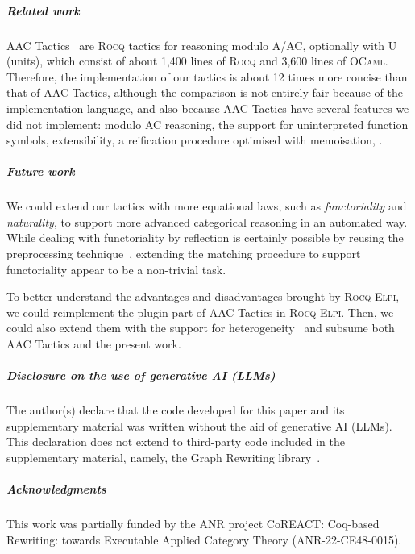 \documentclass[a4paper,UKenglish,cleveref,autoref]{lipics-v2021}
\newcommand{\Rocq}{{\sffamily\scshape Rocq}\xspace}
\newcommand{\RocqElpi}{{\sffamily\scshape Rocq-Elpi}\xspace}
\newcommand{\OCaml}{{\sffamily\scshape OCaml}\xspace}
\begin{document}
\subparagraph{Related work}
AAC Tactics~\cite{DBLP:conf/cpp/BraibantP11,aac-tactics} are \Rocq tactics for reasoning modulo
A/AC, optionally with U (units), which consist of about 1,400 lines of \Rocq and 3,600 lines of
\OCaml.
Therefore, the implementation of our tactics is about 12 times more concise than that of AAC
Tactics, although the comparison is not entirely fair because of the implementation language, and
also because AAC Tactics have several features we did not implement: modulo AC reasoning, the
support for uninterpreted function symbols, extensibility, a reification procedure optimised with
memoisation, \etc.

\subparagraph{Future work}
We could extend our tactics with more equational laws, such as \emph{functoriality} and
\emph{naturality}, to support more advanced categorical reasoning in an automated way.
While dealing with functoriality by reflection is certainly possible by reusing the preprocessing
technique~\cite{DBLP:conf/itp/Sakaguchi22}, extending the matching procedure to support
functoriality appear to be a non-trivial task.

To better understand the advantages and disadvantages brought by \RocqElpi, we could reimplement
the plugin part of AAC Tactics in \RocqElpi.
Then, we could also extend them with the support for heterogeneity~\cite[Section
  6.2]{DBLP:conf/cpp/BraibantP11} and subsume both AAC Tactics and the present work.

\ifx\authoranonymous\relax
\subparagraph{Disclosure on the use of generative AI (LLMs)}

The author(s) declare that the code developed for this paper and its supplementary material was
written without the aid of generative AI (LLMs). This declaration does not extend to third-party
code included in the supplementary material, namely, the Graph Rewriting
library~\cite{DBLP:conf/cpp/ArsacHP26}.
\else
\subparagraph{Acknowledgments}
This work was partially funded by the ANR project CoREACT: Coq-based Rewriting: towards Executable
Applied Category Theory (ANR-22-CE48-0015).

\fi


\end{document}
